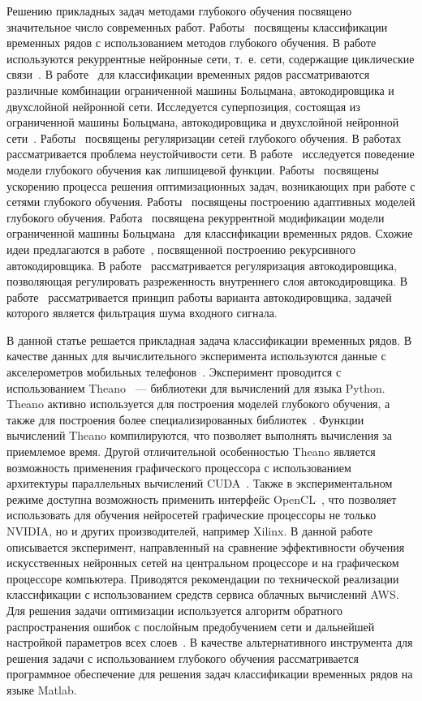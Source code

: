 \documentclass[12pt]{article}
\begin{document}
Решению прикладных задач методами глубокого обучения посвящено значительное число современных работ. Работы~\cite{ts1,ts2,ts3} посвящены классификации временных рядов с использованием методов глубокого обучения. В работе~\cite{ts2} используются рекуррентные нейронные сети, т.~е. сети, содержащие циклические связи~\cite{foundamentals}. В работе~\cite{ts3} для классификации временных рядов рассматриваются различные комбинации ограниченной машины Больцмана, автокодировщика и двухслойной нейронной сети. Исследуется суперпозиция, состоящая из ограниченной машины Больцмана, автокодировщика и двухслойной нейронной сети~\cite{foundamentals}. Работы~\cite{reg1,reg2,reg3,reg4} посвящены регуляризации сетей глубокого обучения. В работах~\cite{stab1, stab2} рассматривается проблема неустойчивости сети. В работе~\cite{stab1} исследуется поведение модели глубокого обучения как липшицевой функции. Работы~\cite{speed1,speed2,speed3} посвящены ускорению процесса решения оптимизационных задач, возникающих при работе с сетями глубокого обучения. Работы~\cite{stab2, ada} посвящены построению адаптивных моделей глубокого обучения. Работа~\cite{recrbm} посвящена рекуррентной модификации модели ограниченной машины Больцмана~\cite{rbm} для классификации временных рядов. Схожие идеи предлагаются в работе~\cite{rae}, посвященной построению рекурсивного автокодировщика. В работе~\cite{sparse} рассматривается регуляризация автокодировщика, позволяющая регулировать разреженность внутреннего слоя автокодировщика. В работе~\cite{denoise} рассматривается принцип работы варианта автокодировщика, задачей которого является фильтрация шума входного сигнала.

В данной статье решается прикладная задача классификации временных рядов. В качестве данных для вычислительного эксперимента используются данные с акселерометров мобильных телефонов~\cite{wisdm}. Эксперимент проводится с использованием Theano~\cite{theano1, theano2} --- библиотеки для вычислений для языка Python. Theano активно используется для построения моделей глубокого обучения, а также для построения более специализированных библиотек~\cite{lasagne, pylearn}. Функции вычислений Theano компилируются, что позволяет выполнять вычисления за приемлемое время. Другой отличительной особенностью Theano является возможность применения графического процессора с использованием архитектуры параллельных вычислений CUDA~\cite{cuda}. Также в экспериментальном режиме доступна возможность применить интерфейс OpenCL~\cite{cl}, что позволяет использовать для обучения нейросетей графические процессоры не только NVIDIA, но и других производителей, например Xilinx. В данной работе описывается эксперимент, направленный на сравнение эффективности обучения искусственных нейронных сетей на центральном процессоре и на графическом процессоре компьютера. Приводятся рекомендации по технической реализации классификации с использованием средств сервиса облачных вычислений AWS. Для решения задачи оптимизации используется алгоритм обратного распространения ошибок с послойным предобучением сети и дальнейшей настройкой параметров всех слоев~\cite{fine}.
В качестве альтернативного инструмента для решения задачи с использованием глубокого обучения рассматривается программное обеспечение для решения задач классификации временных рядов на языке Matlab.
\end{document}
